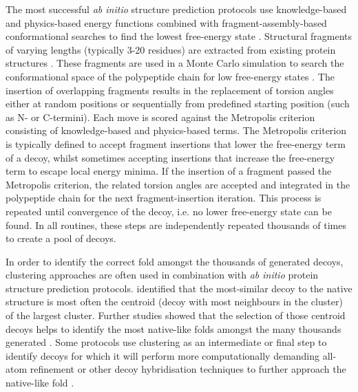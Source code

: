 The most successful \textit{ab initio} structure prediction protocols use knowledge-based and physics-based energy functions combined with fragment-assembly-based conformational searches to find the lowest free-energy state \cite{Rohl2004-dj,Xu2012-jf,Blaszczyk2013-nx,Kosciolek2014-bt,De_Oliveira2018-sg}. Structural fragments of varying lengths (typically 3-20 residues) are extracted from existing protein structures \cite{Abbass2015-qk,Shen2013-wh,Li2008-xu,Kalev2011-sz,Bhattacharya2016-ix,Wang2017-ka,De_Oliveira2015-kb,Gront2011-sv}. These fragments are used in a Monte Carlo simulation to search the conformational space of the polypeptide chain for low free-energy states \cite{Metropolis1949-kp}. The insertion of overlapping fragments results in the replacement of torsion angles either at random positions or sequentially from predefined starting position (such as N- or C-termini). Each move is scored against the Metropolis criterion \cite{Metropolis1949-kp} consisting of knowledge-based and physics-based terms. The Metropolis criterion is typically defined to accept fragment insertions that lower the free-energy term of a decoy, whilst sometimes accepting insertions that increase the free-energy term to escape local energy minima. If the insertion of a fragment passed the Metropolis criterion, the related torsion angles are accepted and integrated in the polypeptide chain for the next fragment-insertion iteration. This process is repeated until convergence of the decoy, i.e. no lower free-energy state can be found. In all routines, these steps are independently repeated thousands of times to create a pool of decoys. 

In order to identify the correct fold amongst the thousands of generated decoys, clustering approaches are often used in combination with \textit{ab initio} protein structure prediction protocols. \textcite{Shortle1998-fq} identified that the most-similar decoy to the native structure is most often the centroid (decoy with most neighbours in the cluster) of the largest cluster. Further studies showed that the selection of those centroid decoys helps to identify the most native-like folds amongst the many thousands generated \cite{Zhang2004-uz,Bradley2005-lw,Oldziej2005-qp}. Some protocols use clustering as an intermediate or final step to identify decoys for which it will perform more computationally demanding all-atom refinement \cite{Bradley2005-lw} or other decoy hybridisation techniques \cite{Zhang2004-uc,Xu2012-jf,Yang2015-oc} to further approach the native-like fold \cite{Kryshtafovych2016-aq}.

